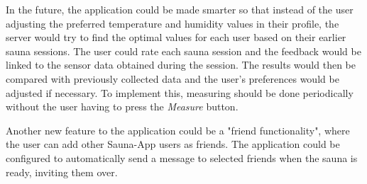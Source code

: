 \documentclass[11pt]{article}
\begin{document}
In the future, the application could be made smarter so that instead of the user adjusting the preferred temperature and humidity values in their profile, the server would try to find the optimal values for each user based on their earlier sauna sessions. The user could rate each sauna session and the feedback would be linked to the sensor data obtained during the session. The results would then be compared with previously collected data and the user's preferences would be adjusted if necessary. To implement this, measuring should be done periodically without the user having to press the \textit{Measure} button.

Another new feature to the application could be a "friend functionality", where the user can add other Sauna-App users as friends. The application could be configured to automatically send a message to selected friends when the sauna is ready, inviting them over.
\end{document}
